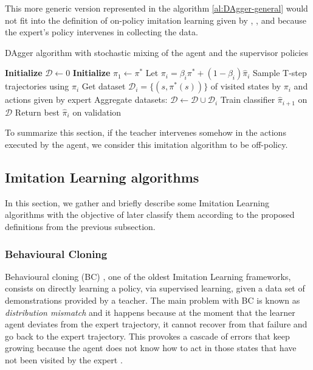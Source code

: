 This more generic version represented in the algorithm \ref{al:DAgger-general} would not fit into the definition of on-policy imitation learning given by \cite{Osa:2018}, \cite{DBLP:journals/corr/LaskeyLHLMFG17}, \cite{OtherLaskeydefinitions:2019} and \cite{Anotherdefinitionfromberkeley:2020} because the expert's policy  intervenes in collecting the data.


\begin{algorithm}[H]
\caption{DAgger algorithm with stochastic mixing of the agent and the supervisor policies }
\begin{algorithmic}[1]
\State \textbf{Initialize} $\mathcal{D} \leftarrow 0$ 
\State \textbf{Initialize} $\hat{\pi}_1 \leftarrow \pi^*$ 
\State Let $\pi_i = \beta_i\pi^* + (1 -\beta_i)\hat{\pi}_i$
\State Sample T-step trajectories using $\pi_i$
\State Get dataset  $\mathcal{D}_i = \{(s, \pi^*(s))\}$ of visited states by $\pi_i$ and actions given by expert
\State Aggregate datasets:  $\mathcal{D} \leftarrow \mathcal{D} \cup  \mathcal{D}_i$
\State  Train classifier $\hat{\pi}_{i+1}$ on $\mathcal{D}$
\EndFor
\State Return best $\hat{\pi}_i$ on validation
\end{algorithmic}
\label{al:DAgger-general}
\end{algorithm}

To summarize this section, if the teacher intervenes somehow in the actions executed by the agent, we consider this imitation algorithm to be off-policy.

\subsection{Imitation Learning algorithms}

In this section, we gather and briefly describe some Imitation Learning algorithms with the objective of later classify them according to the proposed definitions from the previous subsection.




\subsubsection*{Behavioural Cloning}
Behavioural cloning (BC) \cite{Behavioural-Cloning-Pomerleau:1991}, one of the oldest Imitation Learning frameworks, consists on directly learning a policy, via supervised learning, given a data set of demonstrations provided by a teacher. The main problem with BC is known as \textit{distribution mismatch} and it happens because at the moment that the learner agent deviates from the expert trajectory, it cannot recover from that failure and go back to the expert trajectory. This provokes a cascade of errors that keep growing because the agent does not know how to act in those states that have not been visited by the expert \cite{Global-overview-Attia:2018}.


